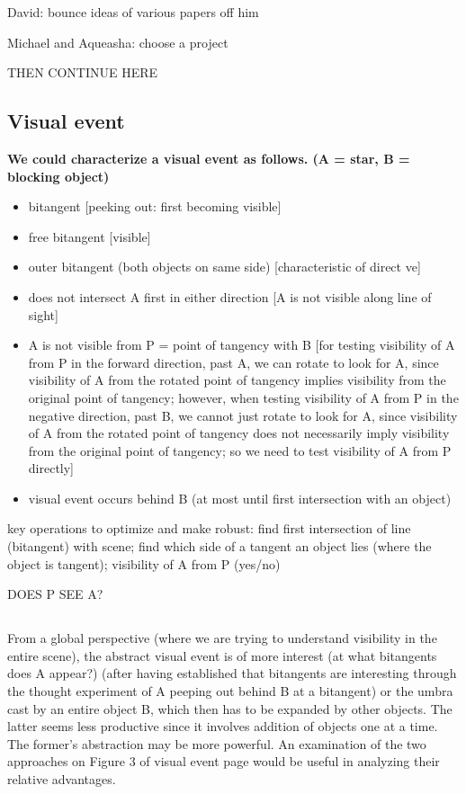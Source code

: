 \documentclass[12pt]{article}
\begin{document}
David: bounce ideas of various papers off him

Michael and Aqueasha: choose a project

\clearpage

THEN CONTINUE HERE

\subsection{Visual event}

{\bf 
We could characterize a visual event as follows. (A = star, B = blocking object)

\begin{itemize}
\item bitangent [peeking out: first becoming visible]
\item free bitangent [visible]
\item outer bitangent (both objects on same side) [characteristic of direct ve]
\item does not intersect A first in either direction [A is not visible along line of sight]
\item A is not visible from P = point of tangency with B
  [for testing visibility of A from P in the forward direction, past A, we can rotate
   to look for A, since visibility of A from the rotated point of tangency implies
   visibility from the original point of tangency; however, 
   when testing visibility of A from P in the negative direction, past B, we cannot just
   rotate to look for A, since visibility of A from the rotated point of tangency does
   not necessarily imply visibility from the original point of tangency; so we need
   to test visibility of A from P directly]
\item visual event occurs behind B (at most until first intersection with an object)
\end{itemize}

key operations to optimize and make robust: 
find first intersection of line (bitangent) with scene;
find which side of a tangent an object lies (where the object is tangent);
visibility of A from P (yes/no)

DOES P SEE A?
}

\clearpage

\subsection{}

From a global perspective (where we are trying to understand visibility in the entire 
scene),
the abstract visual event is of more interest (at what bitangents does A appear?)
(after having established that bitangents are interesting through the thought experiment
of A peeping out behind B at a bitangent)
or the umbra cast by an entire object B, which then has to be expanded by other objects.
The latter seems less productive since it involves addition of objects one at a time.
The former's abstraction may be more powerful.
An examination of the two approaches on Figure 3 of visual event page would be useful
in analyzing their relative advantages.
\end{document}
